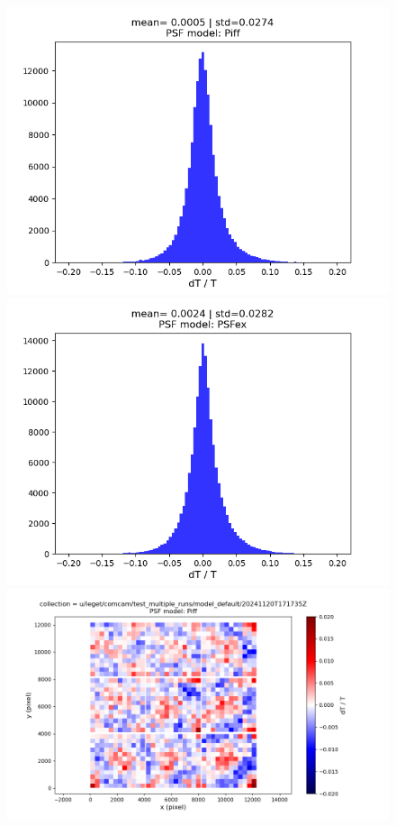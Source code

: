 \begin{figure}
        \centering
        \includegraphics[scale=0.47]{figures/0_dT_1d_Piff}
        \includegraphics[scale=0.47]{figures//0_dT_1d_PSFex}
        \includegraphics[scale=0.3]{figures/0_dT_2d_Piff}

\end{figure}
